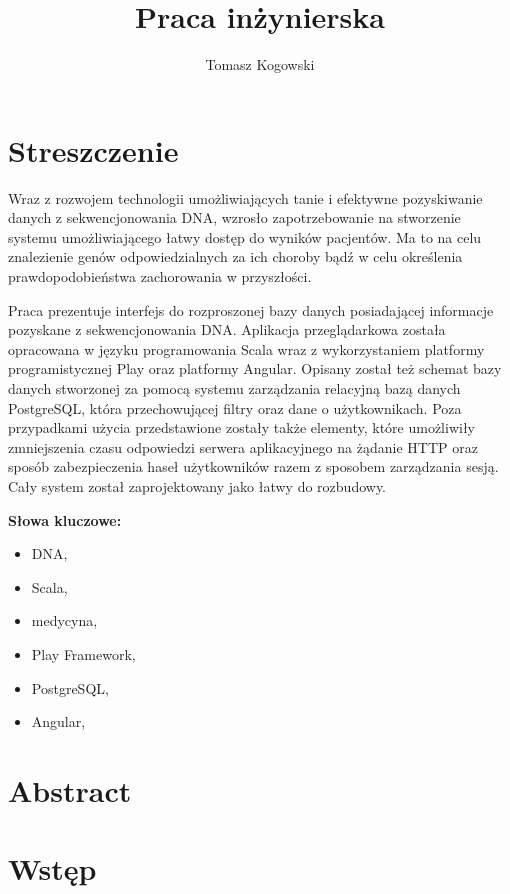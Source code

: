 \documentclass[a4paper,12pt,twoside]{article}
\title{Praca inżynierska}
\author{Tomasz Kogowski}
\begin{document}

\newpage 
\section*{Streszczenie}
Wraz z rozwojem technologii umożliwiających tanie i efektywne
pozyskiwanie danych z sekwencjonowania DNA, wzrosło zapotrzebowanie
na stworzenie systemu umożliwiającego łatwy dostęp do wyników pacjentów.
Ma to na celu znalezienie genów odpowiedzialnych za ich choroby bądź w celu 
określenia prawdopodobieństwa zachorowania w przyszłości. 

Praca prezentuje interfejs do rozproszonej bazy danych posiadającej 
informacje pozyskane z sekwencjonowania DNA. Aplikacja przeglądarkowa została opracowana
w języku programowania Scala wraz z wykorzystaniem platformy programistycznej
Play oraz platformy Angular. Opisany został też schemat bazy danych 
stworzonej za pomocą systemu zarządzania relacyjną bazą danych PostgreSQL, która 
przechowującej filtry oraz dane o użytkownikach. 
Poza przypadkami użycia przedstawione zostały także 
elementy, które umożliwiły zmniejszenia czasu odpowiedzi serwera 
aplikacyjnego na żądanie HTTP oraz sposób zabezpieczenia 
haseł użytkowników razem z sposobem zarządzania sesją. 
Cały system został zaprojektowany jako łatwy do rozbudowy.

\textbf{Słowa kluczowe:}
\begin{itemize}
\item DNA,
\item Scala,
\item medycyna,
\item Play Framework,
\item PostgreSQL,
\item Angular,
\end{itemize}
\newpage 
\section*{Abstract}

\newpage

\newpage
\tableofcontents
 
\newpage
\section{Wstęp}  
\end{document}

